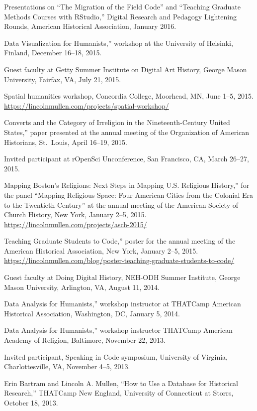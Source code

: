 \documentclass[11pt]{article}
\begin{document}
Presentations on ``The Migration of the Field Code'' and ``Teaching Graduate Methods Courses with RStudio,'' Digital Research and Pedagogy Lightening Rounds, American Historical Association, January 2016.

\noindent{}Data Visualization for Humanists,'' workshop at the University of Helsinki, Finland, December 16--18, 2015. 

Guest faculty at Getty Summer Institute on Digital Art History, George Mason University, Fairfax, VA, July 21, 2015.

Spatial humanities workshop, Concordia College, Moorhead, MN, June 1--5, 2015. \url{https://lincolnmullen.com/projects/spatial-workshop/}

\noindent{}Converts and the Category of Irreligion in the Nineteenth-Century United States,'' paper presented at the annual meeting of the Organization of American Historians, St.~Louis, April 16--19, 2015.

Invited participant at rOpenSci Unconference, San Francisco, CA, March 26--27, 2015.

\noindent{}Mapping Boston's Religions: Next Steps in Mapping U.S. Religious History,'' for the panel ``Mapping Religious Space: Four American Cities from the Colonial Era to the Twentieth Century'' at the annual meeting of the American Society of Church History, New York, January 2--5, 2015.  
\url{https://lincolnmullen.com/projects/asch-2015/}

\noindent{}Teaching Graduate Students to Code,'' poster for the annual meeting of the American Historical Association, New York, January 2--5, 2015.  \url{https://lincolnmullen.com/blog/poster-teaching-graduate-students-to-code/}

Guest faculty at Doing Digital History, NEH-ODH Summer Institute, George Mason University, Arlington, VA, August 11, 2014.

\noindent{}Data Analysis for Humanists,'' workshop instructor at THATCamp American Historical Association, Washington, DC, January 5, 2014.

\noindent{}Data Analysis for Humanists,'' workshop instructor THATCamp American Academy of Religion, Baltimore, November 22, 2013.

Invited participant, Speaking in Code symposium, University of Virginia, Charlottesville, VA, November 4--5, 2013.

Erin Bartram and Lincoln A. Mullen, ``How to Use a Database for Historical Research,'' THATCamp New England, University of Connecticut at Storrs, October 18, 2013.
\end{document}
